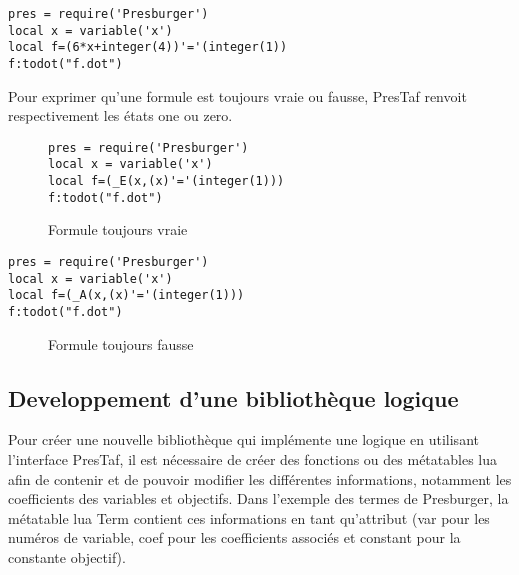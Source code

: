 \begin{lstlisting}[mathescape=true, frame=single]
pres = require('Presburger')
local x = variable('x')
local f=(6*x+integer(4))'='(integer(1))
f:todot("f.dot")
\end{lstlisting}

Pour exprimer qu'une formule est toujours vraie ou fausse, PresTaf renvoit respectivement les états one ou zero.
\begin{figure}[h]
\begin{lstlisting}[mathescape=true, frame=single]
pres = require('Presburger')
local x = variable('x')
local f=(_E(x,(x)'='(integer(1)))
f:todot("f.dot")
\end{lstlisting}

\caption{Formule toujours vraie}
\end{figure}


\begin{lstlisting}[mathescape=true, frame=single]
pres = require('Presburger')
local x = variable('x')
local f=(_A(x,(x)'='(integer(1)))
f:todot("f.dot")
\end{lstlisting}

\begin{figure}[h]
\caption{Formule toujours fausse}
\end{figure}
\clearpage
\subsection{Developpement d’une bibliothèque logique}

Pour créer une nouvelle bibliothèque qui implémente une logique en utilisant l’interface PresTaf, il est nécessaire de créer des fonctions ou des métatables lua afin de contenir et de pouvoir modifier les différentes informations, notamment les coefficients des variables et objectifs. Dans l’exemple des termes de Presburger, la métatable lua Term contient ces informations en tant qu’attribut (var pour les numéros de variable, coef pour les coefficients associés et constant pour la constante objectif).\par

